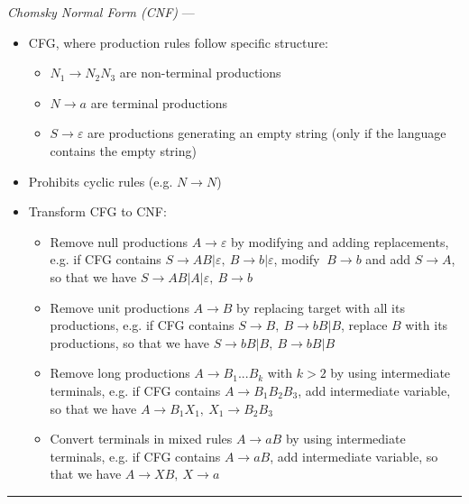 \emph{Chomsky Normal Form (CNF)} ---
\begin{itemize}
    \item CFG, where production rules follow specific structure:
    \begin{itemize}
        \item $N_1 \to N_2 N_3$ are non-terminal productions
        \item $N \to a$ are terminal productions
        \item $S \to \varepsilon$ are productions generating an empty string (only if the language contains the empty string)
    \end{itemize}
    \item Prohibits cyclic rules (e.g. $N \to N$)
    \item Transform CFG to CNF:
    \begin{itemize}
        \item Remove null productions $A \to \varepsilon$ by modifying and adding replacements, e.g. if CFG contains $S \to AB | \varepsilon,\ B \to b|\varepsilon$, modify $\ B \to b$ and add $S \to A$, so that we have $S \to AB  | A | \varepsilon,\ B \to b$
        \item Remove unit productions $A \to B$ by replacing target with all its productions, e.g. if CFG contains $S \to B ,\ B \to bB|B$, replace $B$ with its productions, so that we have $S \to bB|B,\ B \to bB|B$
        \item Remove long productions $A \to B_1...B_k$ with $k > 2$ by using intermediate terminals, e.g. if CFG contains $A \to B_1B_2B_3$, add intermediate variable, so that we have $A \to B_1X_1,\ X_1 \to B_2B_3$
        \item Convert terminals in mixed rules $A \to aB$ by using intermediate terminals, e.g. if CFG contains $A \to aB$, add intermediate variable, so that we have $A \to XB,\ X \to a$
    \end{itemize}
\end{itemize}

{\color{lightgray}\hrule height 0.001mm}

